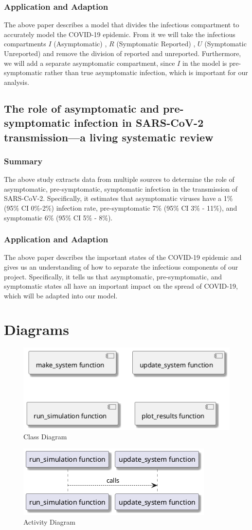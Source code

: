 \documentclass{article}
\begin{document}
\subsubsection{Application and Adaption}
The above paper describes a model that divides the infectious compartment to accurately model the COVID-19 epidemic. From it we will take the infectious compartments $I$ (Asymptomatic) , $R$ (Symptomatic Reported) , $U$ (Symptomatic Unreported) and remove the division of reported and unreported. Furthermore, we will add a separate asymptomatic compartment, since $I$ in the model is pre-symptomatic rather than true asymptomatic infection, which is important for our analysis.

\subsection{The role of asymptomatic and pre-symptomatic infection in SARS-CoV-2 transmission—a living systematic review}
\subsubsection{Summary}
The above study extracts data from multiple sources to determine the role of asymptomatic, pre-symptomatic, symptomatic infection in the transmission of SARS-CoV-2. Specifically, it estimates that asymptomatic viruses have a 1\% (95\% CI 0\%-2\%) infection rate, pre-symptomatic 7\% (95\% CI 3\% - 11\%), and symptomatic 6\% (95\% CI 5\% - 8\%).

\cite{review}
\subsubsection{Application and Adaption}
The above paper describes the important states of the COVID-19 epidemic and gives us an understanding of how to separate the infectious components of our project. Specifically, it tells us that asymptomatic, pre-symptomatic, and symptomatic states all have an important impact on the spread of COVID-19, which will be adapted into our model.

\section{Diagrams}
\begin{figure}[H]
  \center
  \includegraphics[scale=0.5]{A-2}
  \caption{Class Diagram}
\end{figure}

\begin{figure}[H]
  \center
  \includegraphics[scale=0.5]{A-3}
  \caption{Activity Diagram}
\end{figure}

\newpage
\printbibliography
\end{document}
